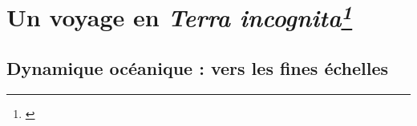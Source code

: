 


\section[Un voyage en \textit{Terra incognita}]{Un voyage en \textit{Terra incognita\footnote{\cite{scotti_large_2010}}}}
\subsection{Dynamique océanique : vers les fines échelles}
\label{subsection_intro1}

